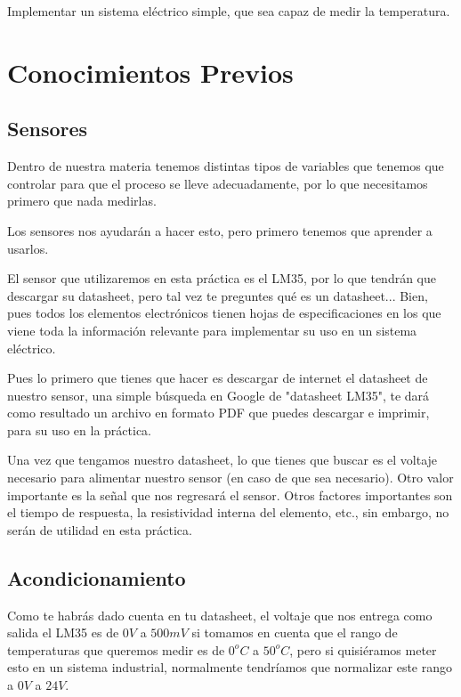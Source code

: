 	Implementar un sistema eléctrico simple, que sea capaz de medir la temperatura.


\section{Conocimientos Previos}


	\subsection{Sensores}

		Dentro de nuestra materia tenemos distintas tipos de variables que tenemos que controlar para que el proceso se lleve adecuadamente, por lo que necesitamos primero que nada medirlas.

		Los sensores nos ayudarán a hacer esto, pero primero tenemos que aprender a usarlos.

		El sensor que utilizaremos en esta práctica es el LM35, por lo que tendrán que descargar su datasheet, pero tal vez te preguntes qué es un datasheet... Bien, pues todos los elementos electrónicos tienen hojas de especificaciones en los que viene toda la información relevante para implementar su uso en un sistema eléctrico.

		Pues lo primero que tienes que hacer es descargar de internet el datasheet de nuestro sensor, una simple búsqueda en Google de "datasheet LM35", te dará como resultado un archivo en formato PDF que puedes descargar e imprimir, para su uso en la práctica.

		Una vez que tengamos nuestro datasheet, lo que tienes que buscar es el voltaje necesario para alimentar nuestro sensor (en caso de que sea necesario). Otro valor importante es la señal que nos regresará el sensor. Otros factores importantes son el tiempo de respuesta, la resistividad interna del elemento, etc., sin embargo, no serán de utilidad en esta práctica.

	\subsection{Acondicionamiento}

		Como te habrás dado cuenta en tu datasheet, el voltaje que nos entrega como salida el LM35 es de $0 V$ a $500 mV$ si tomamos en cuenta que el rango de temperaturas que queremos medir es de $0 ^oC$ a $50 ^oC$, pero si quisiéramos meter esto en un sistema industrial, normalmente tendríamos que normalizar este rango a $0 V$ a $24 V$.


